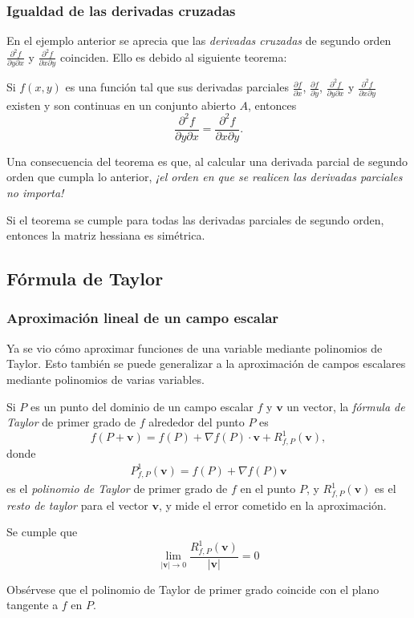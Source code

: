 \begin{frame}
	\frametitle{Igualdad de las derivadas cruzadas}
	En el ejemplo anterior se aprecia que las \emph{derivadas cruzadas} de segundo orden $\frac{\partial^2 f}{\partial y\partial x}$ y $\frac{\partial^2 f}{\partial x\partial y}$ coinciden. Ello es debido al siguiente teorema: 
	
	\begin{teorema}
		Si $f(x,y)$ es una función tal que sus derivadas parciales $\frac{\partial f}{\partial x}$, $\frac{\partial f}{\partial y}$, $\frac{\partial^2 f}{\partial y\partial x}$ y $\frac{\partial^2 f}{\partial x\partial y}$ existen y son continuas en un conjunto abierto $A$, entonces
		\[
			\frac{\partial^2 f}{\partial y\partial x}=\frac{\partial^2 f}{\partial x\partial y}.
		\]
	\end{teorema}
	
	Una consecuencia del teorema es que, al calcular una derivada parcial de segundo orden que cumpla lo anterior, \alert{\emph{¡el orden en que se realicen las derivadas parciales no importa!}}
	
	Si el teorema se cumple para todas las derivadas parciales de segundo orden, entonces la matriz hessiana es simétrica. 
\end{frame}



\subsection{Fórmula de Taylor}
\begin{frame}
	\frametitle{Aproximación lineal de un campo escalar}
	Ya se vio cómo aproximar funciones de una variable mediante polinomios de Taylor. 
	Esto también se puede generalizar a la aproximación de campos escalares mediante polinomios de varias variables. 
	
	Si $P$ es un punto del dominio de un campo escalar $f$ y $\mathbf{v}$ un vector, la \emph{fórmula de Taylor} de primer grado de $f$ alrededor del punto $P$ es
	\[
		f(P+\mathbf{v}) = f(P) + \nabla f(P)\cdot \mathbf{v} +R^1_{f,P}(\mathbf{v}),
	\]
	donde 
	\begin{align*}
		P^1_{f,P}(\mathbf{v}) = f(P)+\nabla f(P)\mathbf{v} 
	\end{align*}
	es el \emph{polinomio de Taylor} de primer grado de $f$ en el punto $P$, y $R^1_{f,P}(\mathbf{v})$ es el \emph{resto de taylor} para el vector $\mathbf{v}$, y mide el error cometido en la aproximación.
	
	Se cumple que  
	\[
		\lim_{|\mathbf{v}|\rightarrow 0} \frac{R^1_{f,P}(\mathbf{v})}{|\mathbf{v}|} = 0
	\]
	
	Obsérvese que el polinomio de Taylor de primer grado coincide con el plano tangente a $f$ en $P$.
\end{frame}


